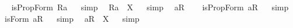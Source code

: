 \begin{isabellebody}
%
\isadelimproof
\ %
\endisadelimproof
%
\isatagproof
{}\isamarkupfalse%
%
\endisatagproof
{\isafoldproof}%
%
\isadelimproof
%
\endisadelimproof
\isanewline
{}\isamarkupfalse%
\ {\isachardoublequoteopen}isPropForm\ {\isacharless}R{}{\isasymbullet}a{\isachargreater}{\isachardoublequoteclose}%
\isadelimproof
\ %
\endisadelimproof
%
\isatagproof
{}\isamarkupfalse%
\ {\isacharparenleft}simp{\isacharparenright}\ \isamarkupfalse%
%
\endisatagproof
{\isafoldproof}%
%
\isadelimproof
%
\endisadelimproof
\isanewline
{}\isamarkupfalse%
\ {\isachardoublequoteopen}{\isacharless}R{}{\isasymbullet}a{\isachargreater}\ {\isacharequal}\ X{\isachardoublequoteclose}%
\isadelimproof
\ %
\endisadelimproof
%
\isatagproof
{}\isamarkupfalse%
\ {\isacharparenleft}simp{\isacharparenright}\ \isamarkupfalse%
%
\endisatagproof
{\isafoldproof}%
%
\isadelimproof
%
\endisadelimproof
\isanewline
\isanewline
{}\isamarkupfalse%
\ {\isachardoublequoteopen}{\isacharbrackleft}{\isacharless}a{\isasymcirc}R{}{\isachargreater}{\isacharbrackright}{\isachardoublequoteclose}\ \isamarkupfalse%
%
\isadelimproof
\ %
\endisadelimproof
%
\isatagproof
{}\isamarkupfalse%
%
\endisatagproof
{\isafoldproof}%
%
\isadelimproof
%
\endisadelimproof
\isanewline
{}\isamarkupfalse%
\ {\isachardoublequoteopen}isPropForm\ {\isacharless}a{\isasymcirc}R{}{\isachargreater}{\isachardoublequoteclose}%
\isadelimproof
\ %
\endisadelimproof
%
\isatagproof
{}\isamarkupfalse%
\ {\isacharparenleft}simp{\isacharparenright}\ \isamarkupfalse%
%
\endisatagproof
{\isafoldproof}%
%
\isadelimproof
%
\endisadelimproof
\isanewline
{}\isamarkupfalse%
\ {\isachardoublequoteopen}isForm\ {\isacharless}a{\isasymcirc}R{}{\isachargreater}{\isachardoublequoteclose}%
\isadelimproof
\ %
\endisadelimproof
%
\isatagproof
{}\isamarkupfalse%
\ {\isacharparenleft}simp{\isacharparenright}\ \isamarkupfalse%
%
\endisatagproof
{\isafoldproof}%
%
\isadelimproof
%
\endisadelimproof
\isanewline
{}\isamarkupfalse%
\ {\isachardoublequoteopen}{\isacharless}a{\isasymcirc}R{}{\isachargreater}\ {\isacharequal}\ X{\isachardoublequoteclose}%
\isadelimproof
\ %
\endisadelimproof
%
\isatagproof
{}\isamarkupfalse%
\ {\isacharparenleft}simp{\isacharparenright}\ \isamarkupfalse%
%
\endisatagproof

\end{isabellebody}
